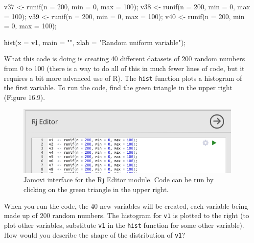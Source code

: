 \documentclass[
]{scrbook}
\newenvironment{Shaded}{\begin{snugshade}}{\end{snugshade}}
\newcommand{\AttributeTok}[1]{\textcolor[rgb]{0.77,0.63,0.00}{#1}}
\newcommand{\DecValTok}[1]{\textcolor[rgb]{0.00,0.00,0.81}{#1}}
\newcommand{\FunctionTok}[1]{\textcolor[rgb]{0.00,0.00,0.00}{#1}}
\newcommand{\NormalTok}[1]{#1}
\newcommand{\OtherTok}[1]{\textcolor[rgb]{0.56,0.35,0.01}{#1}}
\newcommand{\StringTok}[1]{\textcolor[rgb]{0.31,0.60,0.02}{#1}}
\begin{document}
\begin{Shaded}
\begin{Highlighting}[]
\NormalTok{v37 }\OtherTok{\textless{}{-}} \FunctionTok{runif}\NormalTok{(}\AttributeTok{n =} \DecValTok{200}\NormalTok{, }\AttributeTok{min =} \DecValTok{0}\NormalTok{, }\AttributeTok{max =} \DecValTok{100}\NormalTok{);}
\NormalTok{v38 }\OtherTok{\textless{}{-}} \FunctionTok{runif}\NormalTok{(}\AttributeTok{n =} \DecValTok{200}\NormalTok{, }\AttributeTok{min =} \DecValTok{0}\NormalTok{, }\AttributeTok{max =} \DecValTok{100}\NormalTok{);}
\NormalTok{v39 }\OtherTok{\textless{}{-}} \FunctionTok{runif}\NormalTok{(}\AttributeTok{n =} \DecValTok{200}\NormalTok{, }\AttributeTok{min =} \DecValTok{0}\NormalTok{, }\AttributeTok{max =} \DecValTok{100}\NormalTok{);}
\NormalTok{v40 }\OtherTok{\textless{}{-}} \FunctionTok{runif}\NormalTok{(}\AttributeTok{n =} \DecValTok{200}\NormalTok{, }\AttributeTok{min =} \DecValTok{0}\NormalTok{, }\AttributeTok{max =} \DecValTok{100}\NormalTok{);}

\FunctionTok{hist}\NormalTok{(}\AttributeTok{x =}\NormalTok{ v1, }\AttributeTok{main =} \StringTok{""}\NormalTok{, }\AttributeTok{xlab =} \StringTok{"Random uniform variable"}\NormalTok{);}
\end{Highlighting}
\end{Shaded}

What this code is doing is creating 40 different datasets of 200 random numbers from 0 to 100 (there is a way to do all of this in much fewer lines of code, but it requires a bit more advanced use of R).
The \texttt{hist} function plots a histogram of the first variable.
To run the code, find the green triangle in the upper right (Figure 16.9).

\begin{figure}
\includegraphics[width=0.8\linewidth]{img/jamovi_RjEditor} \caption{Jamovi interface for the Rj Editor module. Code can be run by clicking on the green triangle in the upper right.}\label{fig:unnamed-chunk-78}
\end{figure}

When you run the code, the 40 new variables will be created, each variable being made up of 200 random numbers.
The histogram for \texttt{v1} is plotted to the right (to plot other variables, substitute \texttt{v1} in the \texttt{hist} function for some other variable).
How would you describe the shape of the distribution of \texttt{v1}?
\end{document}
